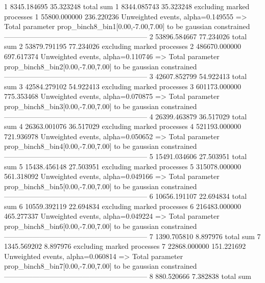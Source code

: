 1          8345.184695     35.323248       total sum                     
1          8344.085743     35.323248       excluding marked processes    
1          55800.000000    236.220236      Unweighted events, alpha=0.149555
  => Total parameter prop_binch8_bin1[0.00,-7.00,7.00] to be gaussian constrained
------------------------------------------------------------
2          53896.584667    77.234026       total sum                     
2          53879.791195    77.234026       excluding marked processes    
2          486670.000000   697.617374      Unweighted events, alpha=0.110746
  => Total parameter prop_binch8_bin2[0.00,-7.00,7.00] to be gaussian constrained
------------------------------------------------------------
3          42607.852799    54.922413       total sum                     
3          42584.279102    54.922413       excluding marked processes    
3          601173.000000   775.353468      Unweighted events, alpha=0.070875
  => Total parameter prop_binch8_bin3[0.00,-7.00,7.00] to be gaussian constrained
------------------------------------------------------------
4          26399.463879    36.517029       total sum                     
4          26363.001076    36.517029       excluding marked processes    
4          521193.000000   721.936978      Unweighted events, alpha=0.050652
  => Total parameter prop_binch8_bin4[0.00,-7.00,7.00] to be gaussian constrained
------------------------------------------------------------
5          15491.034606    27.503951       total sum                     
5          15438.456148    27.503951       excluding marked processes    
5          315078.000000   561.318092      Unweighted events, alpha=0.049166
  => Total parameter prop_binch8_bin5[0.00,-7.00,7.00] to be gaussian constrained
------------------------------------------------------------
6          10656.191107    22.694834       total sum                     
6          10559.392119    22.694834       excluding marked processes    
6          216483.000000   465.277337      Unweighted events, alpha=0.049224
  => Total parameter prop_binch8_bin6[0.00,-7.00,7.00] to be gaussian constrained
------------------------------------------------------------
7          1390.705810     8.897976        total sum                     
7          1345.569202     8.897976        excluding marked processes    
7          22868.000000    151.221692      Unweighted events, alpha=0.060814
  => Total parameter prop_binch8_bin7[0.00,-7.00,7.00] to be gaussian constrained
------------------------------------------------------------
8          880.520666      7.382838        total sum                     
